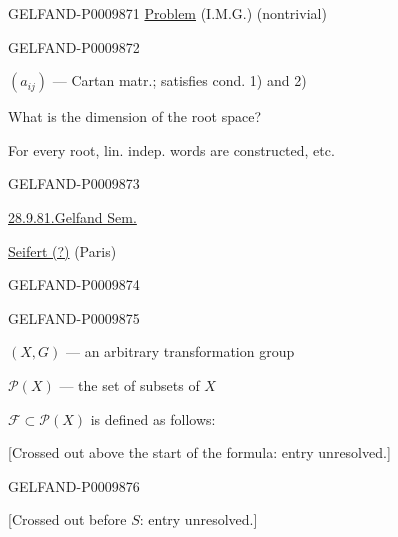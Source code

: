 \begin{GelfandAdjacentEvidence}{GELFAND-P000987}{1}
\underline{Problem} (I.M.G.) (nontrivial)

\end{GelfandAdjacentEvidence}
\begin{GelfandAdjacentEvidence}{GELFAND-P000987}{2}


$(a_{ij})$ --- Cartan matr.; satisfies cond. 1) and 2)

What is the dimension of the root space?

For every root, lin. indep. words are constructed, etc.

\end{GelfandAdjacentEvidence}
\begin{GelfandAdjacentEvidence}{GELFAND-P000987}{3}


\medskip
\underline{28.9.81.}\qquad\underline{Gelfand Sem.}

\underline{Seifert (?)} (Paris)
\end{GelfandAdjacentEvidence}
\begin{GelfandAdjacentEvidence}{GELFAND-P000987}{4}


\end{GelfandAdjacentEvidence}
\begin{GelfandAdjacentEvidence}{GELFAND-P000987}{5}


$(X,G)$ --- an arbitrary transformation group

$\mathcal P(X)$ --- the set of subsets of $X$

$\mathcal F\subset\mathcal P(X)$ is defined as follows:

[Crossed out above the start of the formula: entry unresolved.]
\end{GelfandAdjacentEvidence}
\begin{GelfandAdjacentEvidence}{GELFAND-P000987}{6}


[Crossed out before $S$: entry unresolved.]
\end{GelfandAdjacentEvidence}
